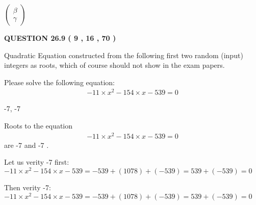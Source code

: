 \documentclass[12pt]{article}
\begin{document}
   
 $  \left( \begin{array}
 {
 c
 }
 \beta \\ 
 \gamma
 \end{array} \right) $ 
  
\vspace{0.2in}
  
{\textbf{\Large{QUESTION
26.9 
 (           9 ,          16 ,          70 )
}}}
  
  


\noindent{}
Quadratic Equation constructed from the following first two random (input) integers as roots,  
which of course should not show in the exam papers.  
\noindent{}


 
 

 
Please solve the following equation:
\begin{eqnarray*}
-11 \times x^2  %
-154
                 \times x    %
-539 =0
\end{eqnarray*}
 
 
 
\noindent{}
 
 

-7,  %
-7
 
 
 
\noindent{}
 
 

 
 
 
\noindent{}
 
 

Roots to the equation
\begin{eqnarray*}
-11 \times x^2  %
-154
                 \times x    %
-539 =0
\end{eqnarray*}
are  %
-7 and  %
-7 .
 
Let us verity  %
-7 first:
$  %
-11 \times x^2  %
-154
                 \times x    %
-539
  = %
-539+( %
1078)+( %
-539)
  = %
539+( %
-539)
  = %
0
$
 
Then verity  %
-7:
$  %
-11 \times x^2  %
-154
                 \times x    %
-539
  = %
-539+( %
1078)+( %
-539)
  = %
539+( %
-539)
  = %
0
$
 
\end{document}
